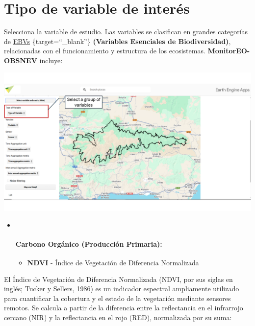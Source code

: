 \documentclass[
]{book}
\providecommand{\tightlist}{%
  \setlength{\itemsep}{0pt}\setlength{\parskip}{0pt}}
\begin{document}
\chapter{Tipo de variable de interés}\label{tipo-variable}

Selecciona la variable de estudio. Las variables se clasifican en grandes categorías de \href{https://geobon.org/ebvs/what-are-ebvs/}{EBVs} \{target=``\_blank''\} \textbf{(Variables Esenciales de Biodiversidad)}, relacionadas con el funcionamiento y estructura de los ecosistemas. \textbf{MonitorEO-OBSNEV} incluye:

\includegraphics{assets/variables.png}

\begin{itemize}
\item ~
  \subsubsection{\texorpdfstring{\textbf{Carbono Orgánico (Producción Primaria):}}{Carbono Orgánico (Producción Primaria):}}\label{carbono-orguxe1nico-producciuxf3n-primaria}

  \begin{itemize}
  \tightlist
  \item
    \textbf{NDVI} - Índice de Vegetación de Diferencia Normalizada
  \end{itemize}
\end{itemize}

El Índice de Vegetación de Diferencia Normalizada (NDVI, por sus siglas en inglés; Tucker y Sellers, 1986) es un indicador espectral ampliamente utilizado para cuantificar la cobertura y el estado de la vegetación mediante sensores remotos. Se calcula a partir de la diferencia entre la reflectancia en el infrarrojo cercano (NIR) y la reflectancia en el rojo (RED), normalizada por su suma:
\end{document}
